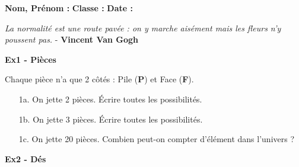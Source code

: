 



\textbf{Nom, Prénom :} \hspace{8cm} \textbf{Classe :} \hspace{3cm} \textbf{Date :}\\
\vspace{-0.8cm}
\begin{center}
  \textit{La normalité est une route pavée : on y marche aisément mais les fleurs n’y poussent pas.} - \textbf{Vincent Van Gogh}
\end{center}

\textbf{Ex1 - Pièces}

\begin{multicols}{2}\noindent 

Chaque pièce n'a que 2 côtés : Pile (\textbf{P}) et Face (\textbf{F}).

\begin{enumerate}
  \item[1a.] On jette 2 pièces. Écrire toutes les possibilités. \\ \Pointilles[2]  \columnbreak 
  \item[1b.] On jette 3 pièces. Écrire toutes les possibilités. \\ \Pointilles[4]
\end{enumerate}  \end{multicols} 
\begin{enumerate}
  \item[1c.] On jette 20 pièces. Combien peut-on compter d'élément dans l'univers ? \\ \Pointilles[4]
\end{enumerate}  

\textbf{Ex2 - Dés}

